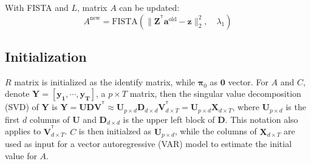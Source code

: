 \documentclass[fleqn,12pt]{article}
\newcommand{\T}{^{\ensuremath{\mathsf{T}}}}           %
\providecommand{\mb}[1]{\boldsymbol{#1}}
\newcommand{\bX}{\mb{X}}
\newcommand{\bY}{\mb{Y}}
\begin{document}
With FISTA and $L$, matrix $A$ can be updated:
\begin{equation}\label{eq:updatea}
A^{\text{new}} = \text{FISTA}(\|\mathbf{Z}^{\T}\mathbf{a}^{\text{old}} -\mathbf{z}\|_2^2,\quad \lambda_1)
\end{equation}

\subsection{Initialization}\label{sec:initial}
$R$ matrix is initialized as the identify matrix, while $\mathbf{\pi}_0$ as $\mathbf{0}$ vector. For $A$ and $C$, denote $\bY = \left[\mathbf{y_1},\cdots,\mathbf{y_T}\right]$, a $p\times T$ matrix, then the singular value decomposition (SVD) of $\bY$ is $\bY = \mathbf{UDV^{\T}} \approx \mathbf{U}_{p \times d} \mathbf{D}_{d \times d} \mathbf{V}_{d \times T}^{\T} =\mathbf{U}_{p\times d}\bX_{d \times T}$, where $\mathbf{U}_{p \times d}$ is the first $d$ columns of $\mathbf{U}$ and $\mathbf{D}_{d\times d}$ is the upper left block of $\mathbf{D}$. This notation also applies to $\mathbf{V}^{\T}_{d \times T}$.
$C$ is then initialzed as $\mathbf{U}_{p\times d}$, while the columns of $\bX_{d \times T}$ are used as input for a vector autoregressive (VAR) model to estimate the initial value for $A$.
\end{document}

